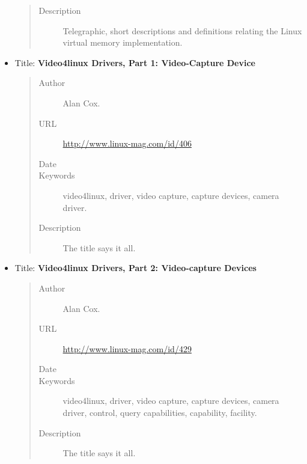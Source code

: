 \documentclass[a4paper,8pt,english]{sphinxmanual}
\begin{document}
\begin{itemize}
\begin{quote}
\begin{description}
\item[{Description}] \leavevmode
Telegraphic, short descriptions and definitions
relating the Linux virtual memory implementation.

\end{description}\end{quote}

\item {} 
Title: \textbf{Video4linux Drivers, Part 1: Video-Capture Device}
\begin{quote}\begin{description}
\item[{Author}] \leavevmode
Alan Cox.

\item[{URL}] \leavevmode
\href{http://www.linux-mag.com/id/406}{http://www.linux-mag.com/id/406}

\item[{Date}] 

\item[{Keywords}] \leavevmode
video4linux, driver, video capture, capture devices,
camera driver.

\item[{Description}] \leavevmode
The title says it all.

\end{description}\end{quote}

\item {} 
Title: \textbf{Video4linux Drivers, Part 2: Video-capture Devices}
\begin{quote}\begin{description}
\item[{Author}] \leavevmode
Alan Cox.

\item[{URL}] \leavevmode
\href{http://www.linux-mag.com/id/429}{http://www.linux-mag.com/id/429}

\item[{Date}] 

\item[{Keywords}] \leavevmode
video4linux, driver, video capture, capture devices,
camera driver, control, query capabilities, capability, facility.

\item[{Description}] \leavevmode
The title says it all.

\end{description}\end{quote}


\end{itemize}
\end{document}
